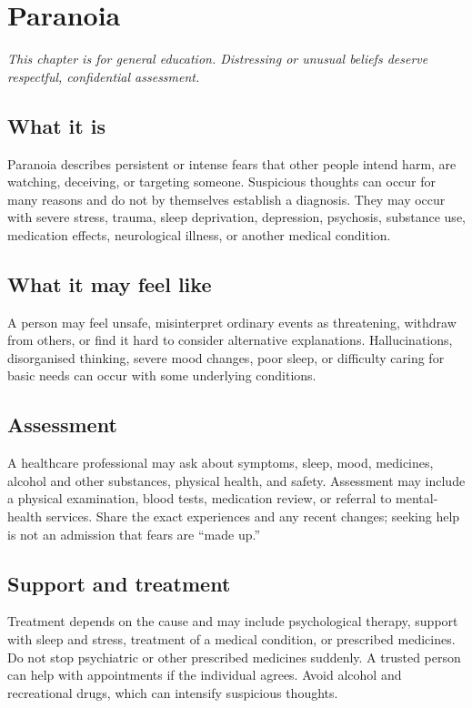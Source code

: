 \chapter{Paranoia}

\medskip
\noindent\textit{This chapter is for general education. Distressing or unusual beliefs deserve respectful, confidential assessment.}

\section*{What it is}
Paranoia describes persistent or intense fears that other people intend harm, are watching, deceiving, or targeting someone. Suspicious thoughts can occur for many reasons and do not by themselves establish a diagnosis. They may occur with severe stress, trauma, sleep deprivation, depression, psychosis, substance use, medication effects, neurological illness, or another medical condition.

\section*{What it may feel like}
A person may feel unsafe, misinterpret ordinary events as threatening, withdraw from others, or find it hard to consider alternative explanations. Hallucinations, disorganised thinking, severe mood changes, poor sleep, or difficulty caring for basic needs can occur with some underlying conditions.

\section*{Assessment}
A healthcare professional may ask about symptoms, sleep, mood, medicines, alcohol and other substances, physical health, and safety. Assessment may include a physical examination, blood tests, medication review, or referral to mental-health services. Share the exact experiences and any recent changes; seeking help is not an admission that fears are “made up.”

\section*{Support and treatment}
Treatment depends on the cause and may include psychological therapy, support with sleep and stress, treatment of a medical condition, or prescribed medicines. Do not stop psychiatric or other prescribed medicines suddenly. A trusted person can help with appointments if the individual agrees. Avoid alcohol and recreational drugs, which can intensify suspicious thoughts.

